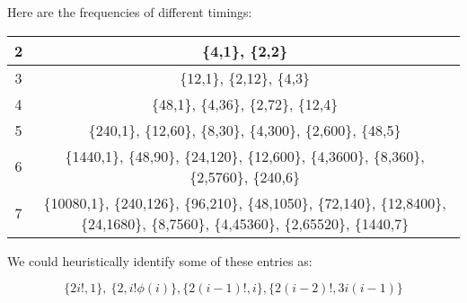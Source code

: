 \documentclass[11pt]{llncs}
\begin{document}
Here are the frequencies of different timings:

\begin{center}
{\small
\begin{tabular}{c|c}\hline
2 & \{4,1\}, \{2,2\}\\\hline
3 & \{12,1\}, \{2,12\}, \{4,3\}\\\hline
4 &\{48,1\}, \{4,36\}, \{2,72\}, \{12,4\}\\\hline
5 &\{240,1\}, \{12,60\}, \{8,30\}, \{4,300\}, \{2,600\}, \{48,5\}\\\hline
6 &\{1440,1\}, \{48,90\}, \{24,120\}, \{12,600\}, \{4,3600\}, \{8,360\}, \{2,5760\}, \{240,6\}\\\hline
7 &\{10080,1\}, \{240,126\}, \{96,210\}, \{48,1050\}, \{72,140\}, \{12,8400\}, \{24,1680\}, \{8,7560\}, \{4,45360\}, \{2,65520\}, \{1440,7\}\\\hline
\end{tabular}}
\end{center}

We could heuristically identify some of these entries as:

$$\{2 i!, 1\},~\{2, i! \phi(i)\},\{2(i-1)!,i\},\{2(i-2)!, 3i(i-1)\}$$
\end{document}
